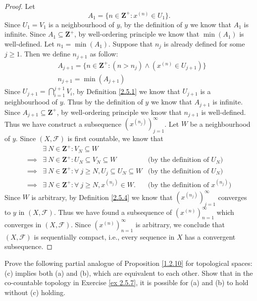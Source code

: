 \begin{proof}
    Let
    \[
        A_1 = \{n \in \mathbf{Z}^+ : x^{(n)} \in U_1\}.
    \]
    Since \(U_1 = V_1\) is a neighbourhood of \(y\), by the definition of \(y\) we know that \(A_1\) is infinite.
    Since \(A_1 \subseteq \mathbf{Z}^+\), by well-ordering principle we know that \(\min(A_1)\) is well-defined.
    Let \(n_1 = \min(A_1)\).
    Suppose that \(n_j\) is already defined for some \(j \geq 1\).
    Then we define \(n_{j + 1}\) as follow:
    \begin{align*}
         & A_{j + 1} = \{n \in \mathbf{Z}^+ : (n > n_j) \land (x^{(n)} \in U_{j + 1})\} \\
         & n_{j + 1} = \min(A_{j + 1})
    \end{align*}
    Since \(U_{j + 1} = \bigcap_{i = 1}^{j + 1} V_i\), by Definition \ref{2.5.1} we know that \(U_{j + 1}\) is a neighbourhood of \(y\).
    Thus by the definition of \(y\) we know that \(A_{j + 1}\) is infinite.
    Since \(A_{j + 1} \subseteq \mathbf{Z}^+\), by well-ordering principle we know that \(n_{j + 1}\) is well-defined.
    Thus we have construct a subsequence \((x^{(n_j)})_{j = 1}^\infty\).
    Let \(W\) be a neighbourhood of \(y\).
    Since \((X, \mathcal{F})\) is first countable, we know that
    \begin{align*}
                 & \exists\ N \in \mathbf{Z}^+ : V_N \subseteq W                                                                                \\
        \implies & \exists\ N \in \mathbf{Z}^+ : U_N \subseteq V_N \subseteq W                    & \text{(by the definition of \(U_N\))}       \\
        \implies & \exists\ N \in \mathbf{Z}^+ : \forall\ j \geq N, U_j \subseteq U_N \subseteq W & \text{(by the definition of \(U_N\))}       \\
        \implies & \exists\ N \in \mathbf{Z}^+ : \forall\ j \geq N, x^{(n_j)} \in W.              & \text{(by the definition of \(x^{(n_j)}\))}
    \end{align*}
    Since \(W\) is arbitrary, by Definition \ref{2.5.4} we know that \((x^{(n_j)})_{j = 1}^\infty\) converges to \(y\) in \((X, \mathcal{F})\).
    Thus we have found a subsequence of \((x^{(n)})_{n = 1}^\infty\) which converges in \((X, \mathcal{F})\).
    Since \((x^{(n)})_{n = 1}^\infty\) is arbitrary, we conclude that \((X, \mathcal{F})\) is sequentially compact, i.e., every sequence in \(X\) has a convergent subsequence.
\end{proof}

\begin{exercise}\label{ex 2.5.10}
    Prove the following partial analogue of Proposition \ref{1.2.10} for topological spaces:
    (c) implies both (a) and (b), which are equivalent to each other.
    Show that in the co-countable topology in Exercise \ref{ex 2.5.7}, it is possible for (a) and (b) to hold without (c) holding.
\end{exercise}

